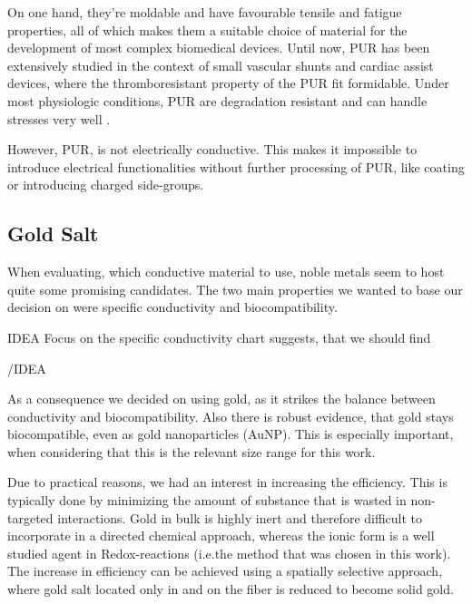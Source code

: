 On one hand, they're moldable and have favourable tensile and fatigue properties, all of which makes them a suitable choice of material for the development of most complex biomedical devices. \cite{Pinchuk}
 Until now, PUR has been extensively studied in the context of small vascular shunts and cardiac assist devices, where the thromboresistant property of the PUR fit formidable. Under most physiologic conditions, PUR are degradation resistant and can handle stresses very well \cite{Ulery}.


However, PUR, is not electrically conductive. This makes it impossible to introduce electrical functionalities without further processing of PUR, like coating or introducing charged side-groups. 

\subsection{Gold Salt}
\label{subsec:GoldSalt}

When evaluating, which conductive material to use, noble metals seem to
host quite some promising candidates. The two main properties we wanted to
base our decision on were specific conductivity and biocompatibility.

IDEA
Focus on the specific conductivity chart suggests, that we should find 

/IDEA

As a consequence we decided on using gold, as it strikes the balance between conductivity and 
biocompatibility.  Also there is robust evidence, that gold stays biocompatible, even 
as gold nanoparticles (AuNP).  This is especially important, when considering that this is the 
relevant size range for this work. \cite{Liu, Shukla}

Due to practical reasons, we had an interest in increasing the efficiency.  This is typically done by minimizing the amount of substance that is wasted in non-targeted interactions. Gold in bulk is highly inert and therefore difficult to incorporate in a directed chemical approach, whereas the ionic form is a well studied agent in Redox-reactions (i.e.the method that was chosen in this work). The increase in efficiency can be achieved using a spatially selective approach, where gold salt located only in and on the fiber is reduced to become solid gold.


